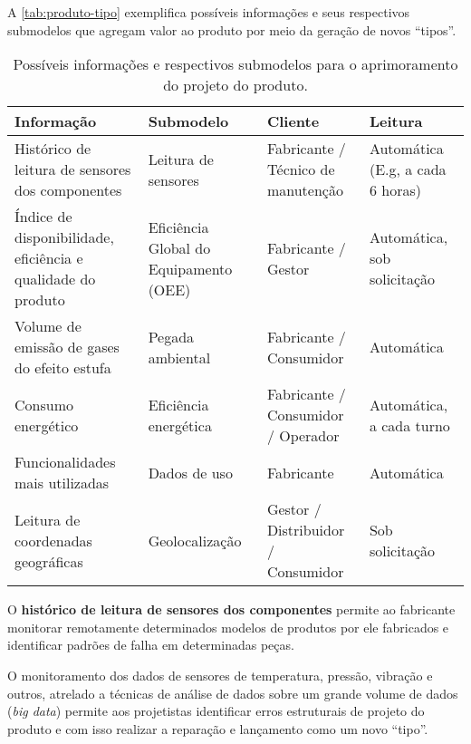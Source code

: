	A \autoref{tab:produto-tipo} exemplifica possíveis informações e seus respectivos submodelos que agregam valor ao produto por meio da geração de novos ``tipos''.
	
	\begin{table}[htb]
		\centering
		\caption{Possíveis informações e respectivos submodelos para o aprimoramento do projeto do produto.}
		\label{tab:produto-tipo}
		\begin{tabular}{p{4cm}p{3cm}p{3cm}p{4cm}}
			
			\hline
			\textbf{Informação}
			& \textbf{Submodelo}
			& \textbf{Cliente}
			& \textbf{Leitura}	
			\\ 
			
			\hline
			Histórico de leitura de sensores dos componentes
			& Leitura de sensores
			& Fabricante / Técnico de manutenção
			& Automática (E.g, a cada 6 horas)
			\\
			
			\hline
			Índice de disponibilidade, eficiência e qualidade do produto
			& Eficiência Global do Equipamento (OEE)
			& Fabricante / Gestor
			& Automática, sob solicitação
			\\
			
			\hline
			Volume de emissão de gases do efeito estufa
			& Pegada ambiental
			& Fabricante / Consumidor
			& Automática
			\\
			
			\hline
			Consumo energético
			& Eficiência energética
			& Fabricante / Consumidor / Operador
			& Automática, a cada turno
			\\
			
			\hline
			Funcionalidades mais utilizadas
			& Dados de uso
			& Fabricante
			& Automática
			\\
			
			\hline
			Leitura de coordenadas geográficas
			& Geolocalização
			& Gestor / Distribuidor / Consumidor
			& Sob solicitação
			\\

			\hline
		\end{tabular}
	\end{table}

	O \textbf{histórico de leitura de sensores dos componentes} permite ao fabricante monitorar remotamente determinados modelos de produtos por ele fabricados e identificar padrões de falha em determinadas peças.
	
	O monitoramento dos dados de sensores de temperatura, pressão, vibração e outros, atrelado a técnicas de análise de dados sobre um grande volume de dados (\textit{big data}) permite aos projetistas identificar erros estruturais de projeto do produto e com isso realizar a reparação e lançamento como um novo ``tipo''.
	

